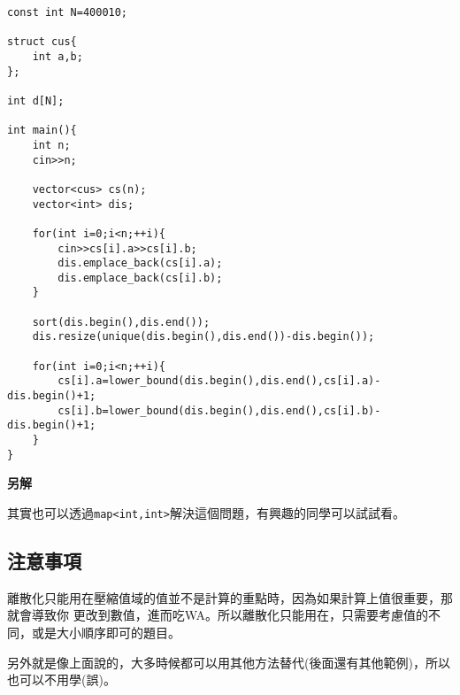 \begin{lstlisting}[caption=離散化範例]
const int N=400010;

struct cus{
    int a,b;
};

int d[N];

int main(){
    int n;
    cin>>n;

    vector<cus> cs(n);
    vector<int> dis;

    for(int i=0;i<n;++i){
        cin>>cs[i].a>>cs[i].b;
        dis.emplace_back(cs[i].a);
        dis.emplace_back(cs[i].b);
    }

    sort(dis.begin(),dis.end());
    dis.resize(unique(dis.begin(),dis.end())-dis.begin());

    for(int i=0;i<n;++i){
        cs[i].a=lower_bound(dis.begin(),dis.end(),cs[i].a)-dis.begin()+1;
        cs[i].b=lower_bound(dis.begin(),dis.end(),cs[i].b)-dis.begin()+1;
    }
}
\end{lstlisting}

    \textbf{另解}
    
    其實也可以透過\verb|map<int,int>|解決這個問題，有興趣的同學可以試試看。

    \subsection{注意事項}
    離散化只能用在壓縮值域的值並不是計算的重點時，因為如果計算上值很重要，那就會導致你
    更改到數值，進而吃WA。所以離散化只能用在，只需要考慮值的不同，或是大小順序即可的題目。

    另外就是像上面說的，大多時候都可以用其他方法替代(後面還有其他範例)，所以也可以不用學(誤)。
    